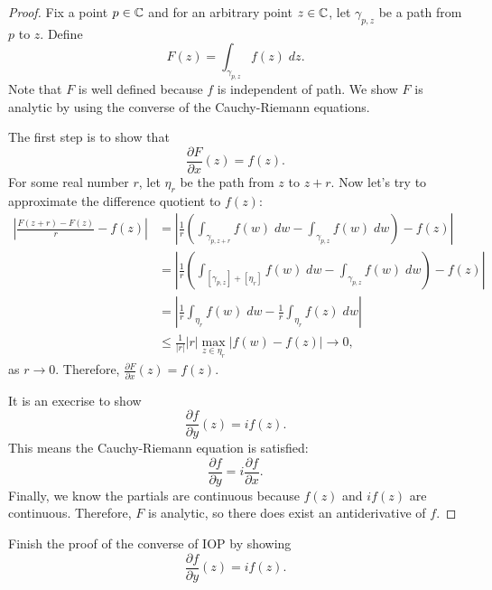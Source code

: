 \documentclass[notes]{subfile}
\begin{document}
\begin{proof}
    Fix a point $p \in \operatorname{\mathbb{C}}$ and for an arbitrary point $z \in \operatorname{\mathbb{C}}$,
    let $\gamma_{p, z}$ be a path from $p$ to $z$.
    Define
    \[ F(z) = \int_{\gamma_{p, z}} f(z) \; dz. \]
    Note that $F$ is well defined because $f$ is independent
    of path.
    We show $F$ is analytic by using
    the converse of the Cauchy-Riemann equations.

    \noindent
    The first step is to show that
    \[ \frac{\partial F}{\partial x}(z) = f(z). \]
    For some real number $r$,
    let $\eta_r$ be the path from $z$ to $z + r$.
    Now let's try to approximate the difference quotient
    to $f(z)$:
    \begin{align*}
        \left| \frac{F(z+r) - F(z)}{r} - f(z)\right| &= 
        \left| \frac{1}{r}\left( \int_{\gamma_{p, z+r}} f(w) \; dw - 
        \int_{\gamma_{p, z}} f(w) \; dw \right)  - f(z) \right| \\
        &= \left| \frac{1}{r}\left( \int_{[\gamma_{p, z}] + [\eta_r]} f(w) \; dw - 
        \int_{\gamma_{p, z}} f(w) \; dw \right)  - f(z) \right| \tag{Independence of Path} \\
        &= \left| \frac{1}{r} \int_{\eta_r} f(w) \; dw - 
        \frac{1}{r} \int_{\eta_r} f(z) \; dw  \right| \tag{Concatenation of Paths} \\
        &\le \frac{1}{|r|} |r| \max_{z \in \eta_r} |f(w) - f(z)|
        \to 0, \tag{ML and Continuity of $f$}
    \end{align*}
    as $r \to 0$.
    Therefore, $\frac{\partial F}{\partial x}(z) = f(z)$.

    \noindent
    It is an execrise to show
    \[ \frac{\partial f}{\partial y} (z) = if(z). \]
    This means the Cauchy-Riemann equation is satisfied:
    \[ \frac{\partial f}{\partial y} = i \frac{\partial f}{\partial x}. \]
    Finally, we know the partials are continuous because
    $f(z)$ and $if(z)$ are continuous.
    Therefore, $F$ is analytic, so there does exist an 
    antiderivative of $f$.

\end{proof}

\begin{exercise}
    Finish the proof of the converse of IOP by showing
    \[ \frac{\partial f}{\partial y} (z) = if(z). \]
\end{exercise}
\end{document}
